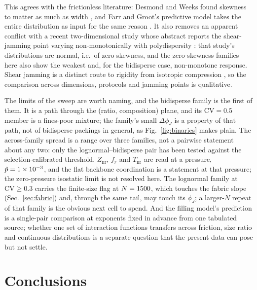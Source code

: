 \documentclass[reprint,aps,pre,amsmath,amssymb,superscriptaddress,longbibliography,nofootinbib,floatfix]{revtex4-2}
\newcommand{\phiJ}{\phi_{J}}
\newcommand{\pHat}{\hat{p}}
\newcommand{\Znr}{Z_{\mathrm{nr}}}
\newcommand{\fr}{f_{r}}
\newcommand{\Tnr}{T_{\mathrm{nr}}}
\newcommand{\CV}{\mathrm{CV}}
\begin{document}
This agrees with the frictionless literature: Desmond and Weeks found skewness to matter as much as width \cite{desmond2014influence}, and Farr and Groot's predictive model takes the entire distribution as input for the same reason \cite{farr2009close}.
It also removes an apparent conflict with a recent two-dimensional study whose abstract reports the shear-jamming point varying non-monotonically with polydispersity \cite{singh2025rigidity}: that study's distributions are normal, i.e.\ of zero skewness, and the zero-skewness families here also show the weakest and, for the bidisperse case, non-monotone response.
Shear jamming is a distinct route to rigidity from isotropic compression \cite{bi2011jamming}, so the comparison across dimensions, protocols and jamming points is qualitative.

The limits of the sweep are worth naming, and the bidisperse family is the first of them.
It is a path through the (ratio, composition) plane, and its $\CV=0.5$ member is a fines-poor mixture; the family's small $\Delta\phiJ$ is a property of that path, not of bidisperse packings in general, as Fig.~\ref{fig:binaries} makes plain.
The across-family spread is a range over three families, not a pairwise statement about any two: only the lognormal--bidisperse pair has been tested against the selection-calibrated threshold.
$\Znr$, $\fr$ and $\Tnr$ are read at a pressure, $\pHat=\pHatTop$, and the flat backbone coordination is a statement at that pressure; the zero-pressure isostatic limit is not resolved here.
The lognormal family at $\CV\ge0.3$ carries the finite-size flag at $N=1500$, which touches the fabric slope (Sec.~\ref{sec:fabric}) and, through the same tail, may touch its $\phiJ$; a larger-$N$ repeat of that family is the obvious next cell to spend.
And the filling model's prediction is a single-pair comparison at exponents fixed in advance from one tabulated source; whether one set of interaction functions transfers across friction, size ratio and continuous distributions is a separate question that the present data can pose but not settle.

\section{Conclusions}
\end{document}
